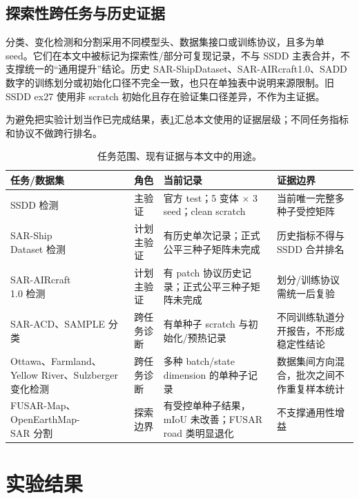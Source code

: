 \documentclass[UTF8,12pt,a4paper]{ctexart}
\begin{document}
\subsection{探索性跨任务与历史证据}
分类、变化检测和分割采用不同模型头、数据集接口或训练协议，且多为单 seed。它们在本文中被标记为探索性/部分可复现记录，不与 SSDD 主表合并，不支撑统一的“通用提升”结论。历史 SAR-ShipDataset、SAR-AIRcraft1.0、SADD 数字的训练划分或初始化口径不完全一致，也只在单独表中说明来源限制。旧 SSDD ex27 使用非 scratch 初始化且存在验证集口径差异，不作为主证据。

为避免把实验计划当作已完成结果，表\ref{tab:evidence_scope}汇总本文使用的证据层级；不同任务指标和协议不做跨行排名。
\begin{table}[H]\centering\scriptsize
\caption{任务范围、现有证据与本文中的用途。}
\label{tab:evidence_scope}
\setlength{\tabcolsep}{4.5pt}
\begin{tabularx}{.99\linewidth}{p{2.1cm}p{2.4cm}p{4.8cm}X}
\toprule
任务/数据集 & 角色 & 当前记录 & 证据边界\\
\midrule
SSDD 检测 & 主验证 & 官方 test；5 变体 $\times$ 3 seed；clean scratch & 当前唯一完整多种子受控矩阵\\
\shortstack[l]{SAR-Ship\\Dataset} 检测 & 计划主验证 & 有历史单次记录；正式公平三种子矩阵未完成 & 历史指标不得与 SSDD 合并排名\\
\shortstack[l]{SAR-AIRcraft\\1.0} 检测 & 计划主验证 & 有 patch 协议历史记录；正式公平三种子矩阵未完成 & 划分/训练协议需统一后复验\\
SAR-ACD、SAMPLE 分类 & 跨任务诊断 & 有单种子 scratch 与初始化/预热记录 & 不同训练轨道分开报告，不形成稳定性结论\\
Ottawa、Farmland、Yellow River、Sulzberger 变化检测 & 跨任务诊断 & 多种 batch/state dimension 的单种子记录 & 数据集间方向混合，批次之间不作重复样本统计\\
FUSAR-Map、\shortstack[l]{OpenEarthMap-\\SAR} 分割 & 探索边界 & 有受控单种子结果，mIoU 未改善；FUSAR road 类明显退化 & 不支撑通用性增益\\
\bottomrule
\end{tabularx}
\end{table}
\section{实验结果}
\end{document}
